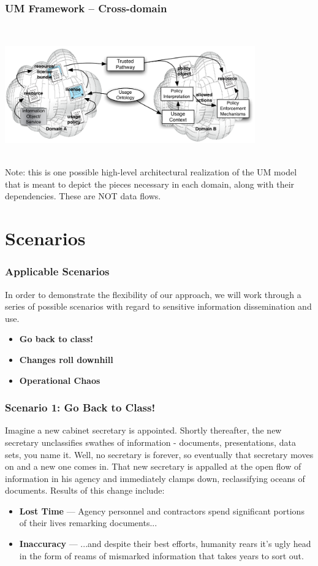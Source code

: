 \documentclass[t,handout, 10pt]{beamer}
\begin{document}
\begin{frame}\frametitle{UM Framework -- Cross-domain}
~\\  \centerline{\includegraphics[width=4.25in]{UM-highlevel.pdf}}~\\
  {\small Note: this is one possible high-level architectural realization of the UM model that is meant to depict the pieces necessary in each domain, along with their dependencies. These are NOT data flows.}
\end{frame}  

\section{Scenarios}

\begin{frame}
\frametitle{Applicable Scenarios}
In order to demonstrate the flexibility of our approach, we will work through a series of possible scenarios with regard to sensitive information dissemination and use.
\newline
\pause
\begin{itemize}
\item \textbf{Go back to class!}
\pause
\item \textbf{Changes roll downhill}
\pause
\item \textbf{Operational Chaos}
\end{itemize}
\end{frame}

\begin{frame}
\frametitle{Scenario 1: Go Back to Class!}
Imagine a new cabinet secretary is appointed.  Shortly thereafter, the new secretary  unclassifies swathes of information - documents, presentations, data sets, you name it.  Well, no secretary is forever, so eventually that secretary moves on and a new one comes in.  That new secretary is appalled at the open flow of information in his agency and immediately clamps down, reclassifying oceans of documents.
\newline
\newline
Results of this change include:
\newline
\pause
\begin{itemize}
\item \textbf{Lost Time} --- Agency personnel and contractors spend significant portions of their lives remarking documents...
\pause
\item \textbf{Inaccuracy} --- ...and despite their best efforts, humanity rears it's ugly head in the form of reams of mismarked information that takes years to sort out.
\end{itemize}
\end{frame}
\end{document}
